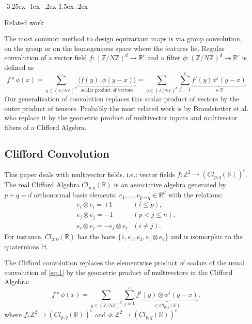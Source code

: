 \documentclass{article}
\makeatletter
\theoremstyle{definition}
\renewcommand\section{\@startsection {section}{1}{\z@}%
  {-3.25ex \@plus -1ex \@minus -.2ex}%
  {1.5ex \@plus .2ex}%
  {\raggedright\normalfont\large\bfseries}}%
\makeatother
\begin{document}
\section{Related work}\label{sec:related}

The most common method to design equivariant maps is via group convolution, on the group or on the homogeneous space where the features lie. Regular convolution of a vector field $f: (\mathbb{Z} /N \mathbb{Z})^d \to \mathbb{R}^c$ and a filter $\phi: (\mathbb{Z} /N \mathbb{Z})^d \to \mathbb{R}^c$ is defined as
\begin{equation}\label{eq:1}
    f*\phi(x)= \sum_{y\in(\mathbb{Z} /N \mathbb{Z})^d} \underbrace{\langle f(y), \phi(y-x)\rangle}_{\text{scalar product of vectors}}=\sum_{y\in(\mathbb{Z} /N \mathbb{Z})^d} \sum_{j=1}^c \underbrace{f^j(y) \phi^j(y-x)}_{\in \mathbb{R}}
\end{equation}
Our generalization of convolution replaces this scalar product of vectors by the outer product of tensors. Probably the most related
work is by Brandstetter et al. \cite{ref1} who replace it by the geometric product of multivector inputs and multivector filters of a Clifford Algebra.

\subsection{Clifford Convolution}
This paper deals with multivector fields, i.e.: vector fields $f:\mathbb{Z}^2 \to (Cl_{p,q}(\mathbb{R}))^c$. The real Clifford Algebra $Cl_{p,q}(\mathbb{R})$ is an associative algebra generated by $p+q=d$ orthonormal basis elements: $e_1, \ldots, e_{p+q}\in \mathbb{R}^d$ with the relations:
\begin{eqnarray}
     e_i\otimes e_i = +1& (i\leq p),  \\
     e_j \otimes e_j = -1& (p<j\leq n),\\
     e_i \otimes e_j = -e_j \otimes e_i & (i\neq j).
\end{eqnarray}
For instance, $Cl_{2,0}(\mathbb{R})$ has the basis $\{1, e_1, e_2, e_1\otimes e_2\}$ and is isomorphic to the quaternions $\mathbb{H}$.

The Clifford convolution replaces the elementwise product of scalars of the usual convolution of \eqref{eq:1} by the geometric product of multivectors in the Clifford Algebra:
\begin{equation}
    f*\phi(x)= \sum_{y\in(\mathbb{Z} /N \mathbb{Z})^d} \sum_{j=1}^c \underbrace{f^j(y) \otimes \phi^j(y-x)}_{\in Cl_{p,q}(\mathbb{R})},
\end{equation}
where $f:\mathbb{Z}^2 \to (Cl_{p,q}(\mathbb{R}))^c$ and $\phi:\mathbb{Z}^2 \to (Cl_{p,q}(\mathbb{R}))^c$
\end{document}
